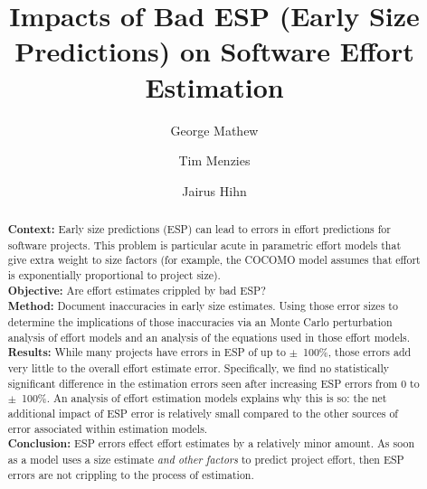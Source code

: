 \documentclass[final,twocolumn]{elsarticle}
\theoremstyle{break}
\begin{document}
\begin{frontmatter}
\title{ Impacts of Bad ESP (Early Size Predictions) on Software Effort Estimation}
\author{George Mathew}
\author{Tim Menzies}
\author{Jairus Hihn}
\address{Department of Computer Science, North Carolina State University, Raleigh, NC, USA,\\
Jet Propulsion Laboratory, Pasadena, CA}


\small

\begin{abstract}
  \textbf{Context:}
  Early size predictions (ESP) can lead to errors in effort predictions for software projects.
  This problem is particular acute in parametric effort models that give extra weight to
  size factors (for example, the COCOMO model assumes that effort is exponentially proportional
  to project size).\\
  \textbf{Objective:} Are effort estimates crippled by bad ESP?
   \\
  \textbf{Method:} Document  inaccuracies in early
  size estimates. Using those error sizes to determine the implications of
  those inaccuracies via an Monte Carlo perturbation analysis of effort models
  and an analysis of the equations used in those effort
  models.\\
\textbf{Results:} 
While many 
projects have errors in ESP of up to $\pm$~100\%,
those errors add very
little to the overall effort estimate error. Specifically,
we find no statistically significant difference in
the estimation errors seen after
increasing ESP errors from 0 to $\pm$~100\%.
An analysis of effort estimation models explains why this is so:
the net additional impact  of ESP error is relatively  small compared to the other sources of error associated within
estimation models.\\
\textbf{Conclusion:} ESP errors effect effort estimates by a relatively
minor amount. As soon as a
model  uses a size
estimate {\em and other factors} to predict project effort,
then ESP errors  are not crippling to the process of estimation.
\end{abstract}
\end{frontmatter}
\end{document}
